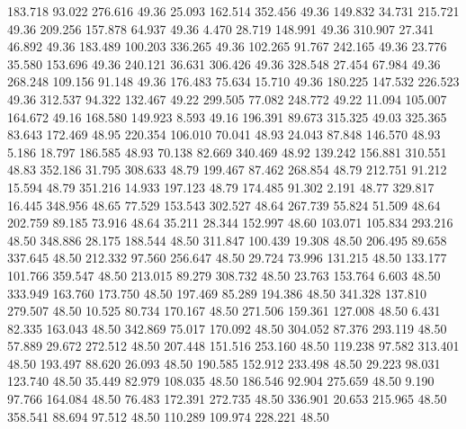  183.718   93.022  276.616        49.36
  25.093  162.514  352.456        49.36
 149.832   34.731  215.721        49.36
 209.256  157.878   64.937        49.36
   4.470   28.719  148.991        49.36
 310.907   27.341   46.892        49.36
 183.489  100.203  336.265        49.36
 102.265   91.767  242.165        49.36
  23.776   35.580  153.696        49.36
 240.121   36.631  306.426        49.36
 328.548   27.454   67.984        49.36
 268.248  109.156   91.148        49.36
 176.483   75.634   15.710        49.36
 180.225  147.532  226.523        49.36
 312.537   94.322  132.467        49.22
 299.505   77.082  248.772        49.22
  11.094  105.007  164.672        49.16
 168.580  149.923    8.593        49.16
 196.391   89.673  315.325        49.03
 325.365   83.643  172.469        48.95
 220.354  106.010   70.041        48.93
  24.043   87.848  146.570        48.93
   5.186   18.797  186.585        48.93
  70.138   82.669  340.469        48.92
 139.242  156.881  310.551        48.83
 352.186   31.795  308.633        48.79
 199.467   87.462  268.854        48.79
 212.751   91.212   15.594        48.79
 351.216   14.933  197.123        48.79
 174.485   91.302    2.191        48.77
 329.817   16.445  348.956        48.65
  77.529  153.543  302.527        48.64
 267.739   55.824   51.509        48.64
 202.759   89.185   73.916        48.64
  35.211   28.344  152.997        48.60
 103.071  105.834  293.216        48.50
 348.886   28.175  188.544        48.50
 311.847  100.439   19.308        48.50
 206.495   89.658  337.645        48.50
 212.332   97.560  256.647        48.50
  29.724   73.996  131.215        48.50
 133.177  101.766  359.547        48.50
 213.015   89.279  308.732        48.50
  23.763  153.764    6.603        48.50
 333.949  163.760  173.750        48.50
 197.469   85.289  194.386        48.50
 341.328  137.810  279.507        48.50
  10.525   80.734  170.167        48.50
 271.506  159.361  127.008        48.50
   6.431   82.335  163.043        48.50
 342.869   75.017  170.092        48.50
 304.052   87.376  293.119        48.50
  57.889   29.672  272.512        48.50
 207.448  151.516  253.160        48.50
 119.238   97.582  313.401        48.50
 193.497   88.620   26.093        48.50
 190.585  152.912  233.498        48.50
  29.223   98.031  123.740        48.50
  35.449   82.979  108.035        48.50
 186.546   92.904  275.659        48.50
   9.190   97.766  164.084        48.50
  76.483  172.391  272.735        48.50
 336.901   20.653  215.965        48.50
 358.541   88.694   97.512        48.50
 110.289  109.974  228.221        48.50
